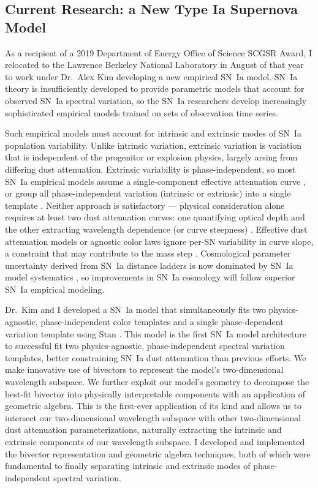 \documentclass[modern]{aastex631}
\begin{document}
\subsection{Current Research: a New Type Ia Supernova Model}
As a recipient of a 2019 Department of Energy Office of Science SCGSR Award, I relocated to the Lawrence Berkeley National Laboratory in August of that year to work under Dr.\ Alex Kim developing a new empirical SN~Ia model. 
SN~Ia theory is insufficiently developed to provide parametric models that account for observed SN~Ia spectral variation, so the SN~Ia researchers develop increasingly sophisticated empirical models trained on sets of observation time series. 

Such empirical models must account for intrinsic and extrinsic modes of SN~Ia population variability. 
Unlike intrinsic variation, extrinsic variation is variation that is independent of the progenitor or explosion physics, largely arsing from differing dust attenuation.  
Extrinsic variability is phase-independent, so most SN~Ia empirical models assume a single-component effective attenuation curve \citep{Jha2007,Burns2011,Mandel2022}, or group all phase-independent variation (intrinsic or extrinsic) into a single template \citep{Guy2007,Kenworthy2021}. 
Neither approach is satisfactory --- physical consideration alone requires at least two dust attenuation curves: one quantifying optical depth and the other extracting wavelength dependence (or curve steepness) \citep{Weingartner2001}. 
Effective dust attenuation models or agnostic color laws ignore per-SN variability in curve slope, a constraint that may contribute to the mass step \citep{Brout2019,Popovic2021}. 
Cosmological parameter uncertainty derived from SN~Ia distance ladders is now dominated by SN~Ia model systematics \citep{Scolnic18}, so improvements in SN~Ia cosmology will follow superior SN~Ia empirical modeling. 

Dr.\ Kim and I developed a SN~Ia model that simultaneously fits two physics-agnostic, phase-independent color templates and a single phase-dependent variation template using Stan \citep{Stan}. 
This model is the first SN~Ia model architecture to successful fit two physics-agnostic, phase-independent spectral variation templates, better constraining SN~Ia dust attenuation than previous efforts. 
We make innovative use of bivectors to represent the model's two-dimensional wavelength subspace. 
We further exploit our model's geometry to decompose the best-fit bivector into physically interpretable components with an application of geometric algebra. 
This is the first-ever application of its kind and allows us to intersect our two-dimensional wavelength subspace with other two-dimensional dust attenuation parameterizations, naturally extracting the intrinsic and extrinsic components of our wavelength subspace. 
I developed and implemented the bivector representation and geometric algebra techniques, both of which were fundamental to finally separating intrinsic and extrinsic modes of phase-independent spectral variation. 
\end{document}
